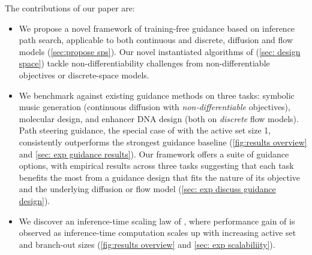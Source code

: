 The contributions of our paper are:
\begin{itemize}[itemsep=0pt, parsep=0pt, topsep=0pt, leftmargin=5pt]
\item We propose a novel framework \ouralg of training-free guidance based on inference path search, applicable to both continuous and discrete, diffusion and flow models (\cref{sec:propose sps}). Our novel instantiated algorithms of \ouralg (\cref{sec: design space}) tackle non-differentiability challenges from non-differentiable objectives or discrete-space models.

\item We benchmark \ouralg against existing guidance methods on three tasks: symbolic music generation (continuous diffusion with {\textit{non-differentiable}} objectives), molecular design, and enhancer DNA design (both on {\textit{discrete}} flow models). 
Path steering guidance, the special case of \ouralg with the active set size 1, consistently outperforms the strongest guidance baseline (\cref{fig:results overview} and \cref{sec: exp guidance results}). Our framework offers a suite of guidance options, with empirical results across three tasks suggesting that each task benefits the most from a guidance design that fits the nature of its objective and the underlying diffusion or flow model (\cref{sec: exp discuss guidance design}).


    
\item We discover an {inference-time scaling law} of \ouralg, where performance gain of \ouralg is observed as inference-time computation scales up with increasing active set and branch-out sizes (\cref{fig:results overview} and \cref{sec: exp scalabiliity}). 

\end{itemize}



